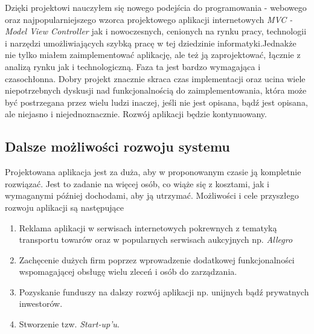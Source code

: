 \documentclass[10pt,titlepage]{article} %
\begin{document}
Dzięki projektowi nauczyłem się nowego podejścia do programowania - webowego oraz najpopularniejszego wzorca projektowego aplikacji internetowych \textit{MVC - Model View Controller} jak i nowoczesnych, cenionych na rynku pracy, technologii i narzędzi umożliwiających szybką pracę w tej dziedzinie informatyki.\mbox\\
Jednakże nie tylko miałem zaimplementować aplikację, ale też ją zaprojektować, łącznie z analizą rynku jak i technologiczną. Faza ta jest bardzo wymagająca i czasochłonna. Dobry projekt znacznie skraca czas implementacji oraz ucina wiele niepotrzebnych dyskusji nad funkcjonalnością do zaimplementowania, która może być postrzegana przez wielu ludzi inaczej, jeśli nie jest opisana, bądź jest opisana, ale niejasno i niejednoznacznie.
Rozwój aplikacji będzie kontynuowany.

\subsection{Dalsze możliwości rozwoju systemu}
Projektowana aplikacja jest za duża, aby w proponowanym czasie ją kompletnie rozwiązać. Jest to zadanie na więcej osób, co wiąże się z kosztami, jak i wymaganymi później dochodami, aby ją utrzymać. Możliwości i cele przyszłego rozwoju aplikacji są następujące
\begin{enumerate}[1.]
\item Reklama aplikacji w serwisach internetowych pokrewnych z tematyką transportu towarów oraz w popularnych serwisach aukcyjnych np. \textit{Allegro}
\item Zachęcenie dużych firm poprzez wprowadzenie dodatkowej funkcjonalności wspomagającej obsługę wielu zleceń i osób do zarządzania.
\item Pozyskanie funduszy na dalszy rozwój aplikacji np. unijnych bądź prywatnych inwestorów.
\item Stworzenie tzw. \textit{Start-up'u}.
\end{enumerate}

\mbox{}
\thispagestyle{empty}
\newpage




\end{document}
